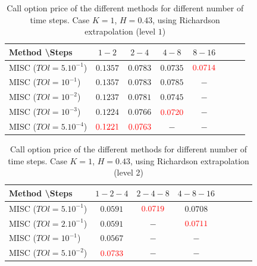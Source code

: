 \documentclass[11pt]{article}
\begin{document}
\begin{table}[h!]
	\centering
	\begin{tabular}{l*{6}{c}r}
		Method \textbackslash  Steps           &$1-2$ & $2-4$ & $4-8$ & $8-16$\\
		\hline
		MISC ($TOl=5.10^{-1}$)& $0.1357$  & $0.0783$ & $0.0735$ & ${\color{red}0.0714}$ \\
		MISC ($TOl=10^{-1}$)  &$0.1357$  &$0.0783$ & $0.0785$ & $-$  \\
		MISC ($TOl=10^{-2}$)  & $0.1237$ &$0.0781$ & $0.0745$ & $-$  \\
		MISC ($TOl=10^{-3}$)  & $0.1224$ &$0.0766$ & ${\color{red}0.0720}$ & $-$ \\
		MISC ($TOl=5.10^{-4}$)  &${\color{red}0.1221}$ & ${\color{red}0.0763}$ & $-$ & $-$ \\
		\hline
	\end{tabular}
	\caption{ Call option price of the different methods for different number of time steps. Case $K=1$, $H=0.43$, using Richardson extrapolation (level $1$)}
	\label{table: Call option price of the different methods for different number of time steps. Case $K=1$, using Richardson extrapolation}
\end{table}







\begin{table}[h!]
	\centering
	\begin{tabular}{l*{6}{c}r}
		Method \textbackslash  Steps           &$1-2-4$ & $2-4-8$ & $4-8-16$\\
		\hline
		MISC ($TOl=5.10^{-1}$)& $0.0591$  & ${\color{red}0.0719}$ & $0.0708$  \\
		MISC ($TOl=2.10^{-1}$)  &$0.0591$ &$-$ & ${\color{red}0.0711}$  \\
		MISC ($TOl=10^{-1}$)  &$0.0567$  &$-$ & $-$   \\
		MISC ($TOl=5.10^{-2}$)  & ${\color{red}0.0733}$ & $-$ & $-$  \\
		\hline
	\end{tabular}
	\caption{ Call option price of the different methods for different number of time steps. Case $K=1$, $H=0.43$, using Richardson extrapolation (level 2)}
	\label{table: Call option price of the different methods for different number of time steps. Case $K=1$, using Richardson extrapolation_level2}
\end{table}
\end{document}
